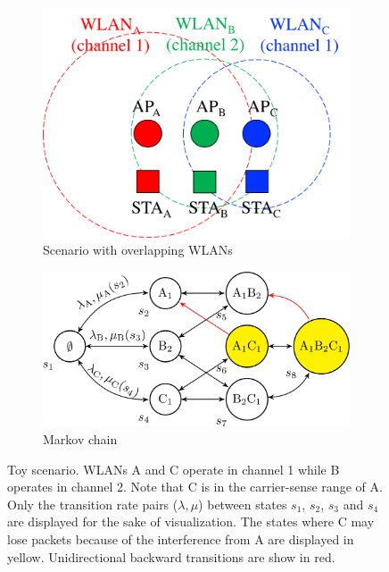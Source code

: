 \documentclass[preprint,12pt]{elsarticle}
\begin{document}
\begin{figure}[h!]
	\centering		
	\begin{subfigure}[b]{0.35\textwidth}
		\includegraphics[width=\textwidth]{three_wlans_ctmn_a}
		\caption{Scenario with overlapping WLANs}\label{fig:three_wlans_ctmn_a}
	\end{subfigure}
	\begin{subfigure}[b]{0.5\textwidth}
		\includegraphics[width=\textwidth]{three_wlans_ctmn_b}
		\caption{Markov chain}\label{fig:three_wlans_ctmn_b}
	\end{subfigure}
	\caption{Toy scenario. WLANs A and C operate in channel 1 while B operates in channel 2. Note that C is in the carrier-sense range of A. Only the transition rate pairs ($\lambda, \mu$) between states $s_1$, $s_2$, $s_3$ and $s_4$ are displayed for the sake of visualization. The states where C may lose packets because of the interference from A are displayed in yellow. Unidirectional backward transitions are show in red.}    
	\label{fig:three_wlans_ctmn}
\end{figure}
\end{document}
